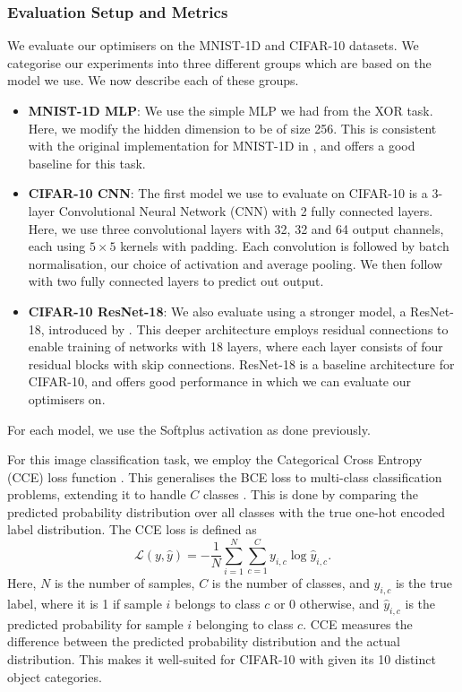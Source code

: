 \subsubsection{Evaluation Setup and Metrics}
We evaluate our optimisers on the MNIST-1D and CIFAR-10 datasets. We categorise our experiments into three different groups which are based on the model we use. We now describe each of these groups.

\begin{itemize}
    \item \textbf{MNIST-1D MLP}: We use the simple MLP we had from the XOR task. Here, we modify the hidden dimension to be of size 256. This is consistent with the original implementation for MNIST-1D in \citep{greydanus_mnist1d}, and offers a good baseline for this task.
    \item \textbf{CIFAR-10 CNN}: The first model we use to evaluate on CIFAR-10 is a 3-layer Convolutional Neural Network (CNN) with 2 fully connected layers. Here, we use three convolutional layers with 32, 32 and 64 output channels, each using $5 \times 5$ kernels with padding. Each convolution is followed by batch normalisation, our choice of activation and average pooling. We then follow with two fully connected layers to predict out output.
    \item \textbf{CIFAR-10 ResNet-18}: We also evaluate using a stronger model, a ResNet-18, introduced by \citep{resnet}. This deeper architecture employs residual connections to enable training of networks with 18 layers, where each layer consists of four residual blocks with skip connections. ResNet-18 is a baseline architecture for CIFAR-10, and offers good performance in which we can evaluate our optimisers on. 
\end{itemize}
For each model, we use the Softplus activation as done previously. 

For this image classification task, we employ the Categorical Cross Entropy (CCE) loss function \citep{mao2023cross}. This generalises the BCE loss to multi-class classification problems, extending it to handle $C$ classes \citep{mao2023cross}. This is done by comparing the predicted probability distribution over all classes with the true one-hot encoded label distribution. The CCE loss is defined as
\begin{equation}
\mathcal{L}(y, \hat{y}) = -\frac{1}{N} \sum_{i=1}^N \sum_{c=1}^C y_{i,c} \log \hat{y}_{i,c}.
\end{equation}
Here, $N$ is the number of samples, $C$ is the number of classes, and $y_{i,c}$ is the true label, where it is 1 if sample $i$ belongs to class $c$ or 0 otherwise, and $\hat{y}_{i,c}$ is the predicted probability for sample $i$ belonging to class $c$. CCE measures the difference between the predicted probability distribution and the actual distribution. This makes it well-suited for CIFAR-10 with given its 10 distinct object categories.

